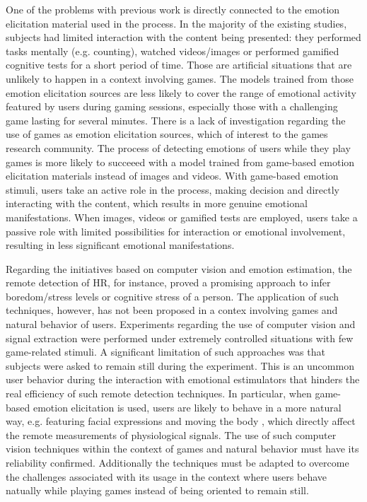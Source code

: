 One of the problems with previous work is directly connected to the emotion elicitation material used in the process. In the majority of the existing studies, subjects had limited interaction with the content being presented: they performed tasks mentally (e.g. counting), watched videos/images or performed gamified cognitive tests for a short period of time. Those are artificial situations that are unlikely to happen in a context involving games. The models trained from those emotion elicitation sources are less likely to cover the range of emotional activity featured by users during gaming sessions, especially those with a challenging game lasting for several minutes. There is a lack of investigation regarding the use of games as emotion elicitation sources, which of interest to the games research community. The process of detecting emotions of users while they play games is more likely to succeeed with a model trained from game-based emotion elicitation materials instead of images and videos. With game-based emotion stimuli, users take an active role in the process, making decision and directly interacting with the content, which results in more genuine emotional manifestations. When images, videos or gamified tests are employed, users take a passive role with limited possibilities for interaction or emotional involvement, resulting in less significant emotional manifestations.

Regarding the initiatives based on computer vision and emotion estimation, the remote detection of HR, for instance, proved a promising approach to infer boredom/stress levels \parencite{kukolja2014comparative} or cognitive stress \parencite{mcduff2014remote} of a person. The application of such techniques, however, has not been proposed in a contex involving games and natural behavior of users. Experiments regarding the use of computer vision and signal extraction were performed under extremely controlled situations with few game-related stimuli. A significant limitation of such approaches was that subjects were asked to remain still during the experiment. This is an uncommon user behavior during the interaction with emotional estimulators that hinders the real efficiency of such remote detection techniques. In particular, when game-based emotion elicitation is used, users are likely to behave in a more natural way, e.g. featuring facial expressions and moving the body \parencite{bevilacqua2016variations}, which directly affect the remote measurements of physiological signals. The use of such computer vision techniques within the context of games and natural behavior must have its reliability confirmed. Additionally the techniques must be adapted to overcome the challenges associated with its usage in the context where users behave natually while playing games instead of being oriented to remain still.

